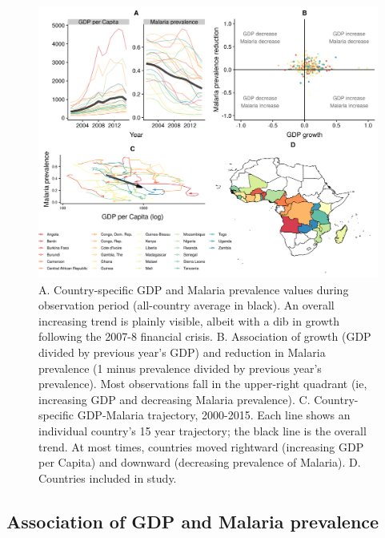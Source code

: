 \documentclass[9pt,twocolumn,twoside,lineno]{pnas-new}
\begin{document}
\begin{figure}%
\centering
\includegraphics[width=.9\linewidth]{../figures/descriptive}
\caption{A. Country-specific GDP and Malaria prevalence values during observation period (all-country average in black). An overall increasing trend is plainly visible, albeit with a dib in growth following the 2007-8 financial crisis. B. Association of growth (GDP divided by previous year's GDP) and reduction in Malaria prevalence (1 minus prevalence divided by previous year's prevalence). Most observations fall in the upper-right quadrant (ie, increasing GDP and decreasing Malaria prevalence). C. Country-specific GDP-Malaria trajectory, 2000-2015. Each line shows an individual country's 15 year trajectory; the black line is the overall trend. At most times, countries moved rightward (increasing GDP per Capita) and downward (decreasing prevalence of Malaria). D. Countries included in study.}
\label{fig:descriptive}
\end{figure}


\subsection*{Association of GDP and Malaria prevalence}
\end{document}
